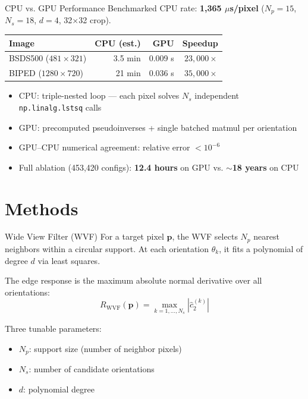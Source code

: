 \documentclass[10pt, aspectratio=169]{beamer}
\begin{document}
\begin{frame}{CPU vs. GPU Performance}
  Benchmarked CPU rate: \textbf{1,365 $\mu$s/pixel} ($N_p\!=\!15$, $N_s\!=\!18$, $d\!=\!4$, 32$\times$32 crop).

  \vspace{0.3em}
  \centering
  \begin{tabular}{lrrr}
    \toprule
    \textbf{Image} & \textbf{CPU (est.)} & \textbf{GPU} & \textbf{Speedup} \\
    \midrule
    BSDS500 ($481 \times 321$) & 3.5 min  & 0.009 s & $23{,}000\times$ \\
    BIPED ($1280 \times 720$)  & 21 min   & 0.036 s & $35{,}000\times$ \\
    \bottomrule
  \end{tabular}

  \vspace{0.5em}
  \flushleft
  \begin{itemize}
    \item CPU: triple-nested loop --- each pixel solves $N_s$ independent \texttt{np.linalg.lstsq} calls
    \item GPU: precomputed pseudoinverses + single batched matmul per orientation
    \item GPU--CPU numerical agreement: relative error $< 10^{-6}$
    \item Full ablation (453,420 configs): \textbf{12.4 hours} on GPU vs. $\sim$\textbf{18 years} on CPU
  \end{itemize}
\end{frame}

\section{Methods}

\begin{frame}{Wide View Filter (WVF)}
  For a target pixel $\mathbf{p}$, the WVF selects $N_p$ nearest neighbors within a circular support. At each orientation $\theta_k$, it fits a polynomial of degree $d$ via least squares.

  \vspace{0.3em}
  The edge response is the maximum absolute normal derivative over all orientations:
  \[
    R_{\text{WVF}}(\mathbf{p}) = \max_{k = 1, \ldots, N_s} |\hat{c}_2^{(k)}|
  \]

  \vspace{0.3em}
  Three tunable parameters:
  \begin{itemize}
    \item $N_p$: support size (number of neighbor pixels)
    \item $N_s$: number of candidate orientations
    \item $d$: polynomial degree
  \end{itemize}
\end{frame}
\end{document}

